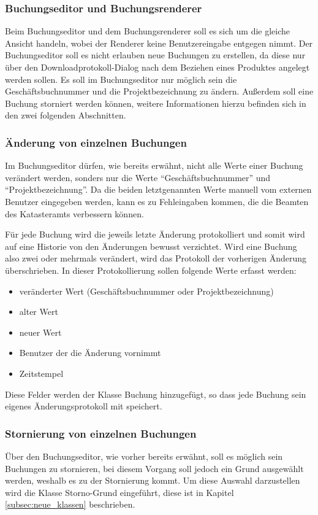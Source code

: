 \subsubsection{Buchungseditor und Buchungsrenderer}
Beim Buchungseditor und dem Buchungsrenderer soll es sich um die gleiche Ansicht handeln, wobei der Renderer keine Benutzereingabe entgegen nimmt.
Der Buchungseditor soll es nicht erlauben neue Buchungen zu erstellen, da diese nur über den Downloadprotokoll-Dialog nach dem Beziehen eines Produktes angelegt werden sollen.
Es soll im Buchungseditor nur möglich sein die Geschäftsbuchnummer und die Projektbezeichnung zu ändern.
Außerdem soll eine Buchung storniert werden können, weitere Informationen hierzu befinden sich in den zwei folgenden Abschnitten.

\subsubsection{Änderung von einzelnen Buchungen} \label{subsubsec:aendern_buchung}
Im Buchungseditor dürfen, wie bereits erwähnt, nicht alle Werte einer Buchung verändert werden, sonders nur die Werte \enquote{Geschäftsbuchnummer} und \enquote{Projektbezeichnung}. Da die beiden letztgenannten Werte manuell vom externen Benutzer eingegeben werden, kann es zu Fehleingaben kommen, die die Beamten des Katasteramts verbessern können.

Für jede Buchung wird die jeweils letzte Änderung protokolliert und somit wird auf eine Historie von den Änderungen bewusst verzichtet. Wird eine Buchung also zwei oder mehrmals verändert, wird das Protokoll der vorherigen Änderung überschrieben.
In dieser Protokollierung sollen folgende Werte erfasst werden:
\begin{itemize}
\item veränderter Wert (Geschäftsbuchnummer oder Projektbezeichnung)
\item alter Wert
\item neuer Wert
\item Benutzer der die Änderung vornimmt
\item Zeitstempel
\end{itemize}
Diese Felder werden der Klasse Buchung hinzugefügt, so dass jede Buchung sein eigenes Änderungsprotokoll mit speichert.

\subsubsection{Stornierung von einzelnen Buchungen} \label{subsubsec:storno_buchung}
Über den Buchungseditor, wie vorher bereits erwähnt, soll es möglich sein Buchungen zu stornieren, bei diesem Vorgang soll jedoch ein Grund ausgewählt werden, weshalb es zu der Stornierung kommt. Um diese Auswahl darzustellen wird die Klasse Storno-Grund eingeführt, diese ist in Kapitel \ref{subsec:neue_klassen} beschrieben.

